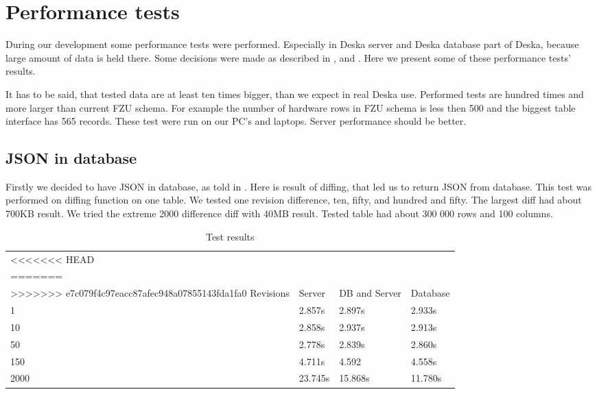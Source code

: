 \documentclass[deska]{subfiles}
\begin{document}
\section{Performance tests}
\label{sec:performance}

During our development some performance tests were performed. Especially in Deska server and Deska database
part of Deska, because large amount of data is held there. Some decisions were made as described in
,  and .
Here we present some of these performance tests' results.

It has to be said, that tested data are at least ten times bigger, than we
expect in real Deska use. Performed tests are hundred times and more larger
than current FZU schema.
For example the number of hardware rows in FZU schema is less then 500 
and the biggest table interface has 565 records.
These test were run on our PC's and laptops. Server performance should be better.

\subsection{JSON in database}
\label{sec:test-json}
Firstly we decided to have JSON in database, as told in .
Here is result of diffing, that led us to
return JSON from database.
This test was performed on diffing function on one table.
We tested one revision difference, ten, fifty, and hundred and fifty.
The largest diff had about 700KB result.
We tried the extreme 2000 difference diff with 40MB result.
Tested table had about 300 000 rows and 100 columns.

\label{test:json}
\begin{longtable}{ l | l | l | l}
<<<<<<< HEAD
\caption{Test results}\\
=======
\caption{Test results} \\
>>>>>>> e7c079f4c97eacc87afec948a07855143fda1fa0
Revisions & Server & DB and Server & Database \\
\hline
\endhead
1 & 2.857s & 2.897s & 2.933s \\
10 & 2.858s & 2.937s & 2.913s \\
50 & 2.778s & 2.839s & 2.860s \\
150 & 4.711s & 4.592 & 4.558s \\
2000 & 23.745s & 15.868s & 11.780s \\
\end{longtable}
\end{document}
